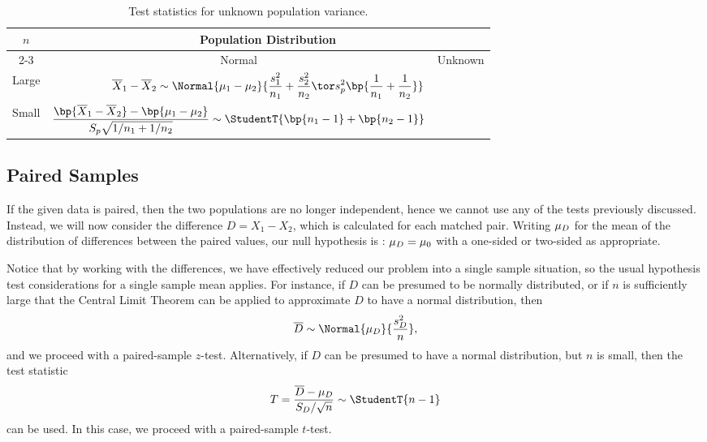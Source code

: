 \begin{table}[H]
    \centering
    \bgroup
    \def\arraystretch{1.5}
    \begin{tabular}{|c|cc|}
    \hline
    \multirow{2}{*}{$n$} & \multicolumn{2}{c|}{Population Distribution} \\ \cline{2-3} 
    & \multicolumn{1}{c|}{Normal} & Unknown \\ \hline
    Large & \multicolumn{2}{c|}{\cellcolor{black!20} $\displaystyle \ol{X}_1 - \ol{X}_2 \sim \Normal{\m_1 - \m_2}{\frac{s_1^2}{n_1} + \frac{s_2^2}{n_2} \tor s_p^2 \bp{\frac{1}{n_1} + \frac{1}{n_2}}}$} \\ \hline
    Small & \multicolumn{1}{c|}{$\displaystyle \frac{\bp{\ol{X}_1 - \ol{X}_2} - \bp{\m_1 - \m_2}}{S_p \sqrt{1/n_1 + 1/n_2}} \sim \StudentT{\bp{n_1 - 1} + \bp{n_2 - 1}}$} & \cellcolor{black} \\ \hline
    \end{tabular}
    \egroup
    \caption{Test statistics for unknown population variance.}
\end{table}

\subsection{Paired Samples}

If the given data is paired, then the two populations are no longer independent, hence we cannot use any of the tests previously discussed. Instead, we will now consider the difference $D = X_1 - X_2$, which is calculated for each matched pair. Writing $\mu_D$ for the mean of the distribution of differences between the paired values, our null hypothesis is \nullhyp: $\mu_D = \mu_0$ with a one-sided or two-sided \althyp{} as appropriate.

Notice that by working with the differences, we have effectively reduced our problem into a single sample situation, so the usual hypothesis test considerations for a single sample mean applies. For instance, if $D$ can be presumed to be normally distributed, or if $n$ is sufficiently large that the Central Limit Theorem can be applied to approximate $D$ to have a normal distribution, then \[\ol{D} \sim \Normal{\m_D}{\frac{s_D^2}{n}},\] and we proceed with a paired-sample $z$-test. Alternatively, if $D$ can be presumed to have a normal distribution, but $n$ is small, then the test statistic \[T = \frac{\ol{D} - \m_D}{S_D / \sqrt{n}} \sim \StudentT{n-1}\] can be used. In this case, we proceed with a paired-sample $t$-test.

